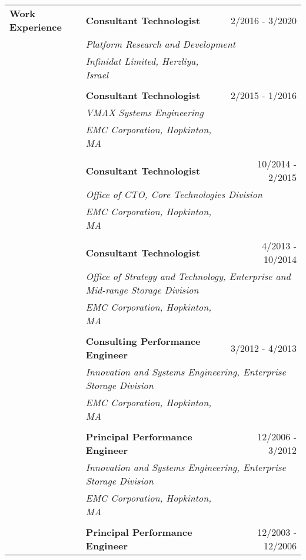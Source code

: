 \documentclass[10pt]{article}
\begin{document}
\begin{longtable}{p{ 90pt}p{299pt}r}
{\bf Work Experience} & {\bf Consultant Technologist} & {2/2016 - 3/2020}\\
                      & \multicolumn{2}{p{4.5in}}{\em Platform Research and Development} \\
                      & {\em Infinidat Limited, Herzliya, Israel} \\
\\
                      & {\bf Consultant Technologist} & {2/2015 - 1/2016}\\
                      & \multicolumn{2}{p{4.5in}}{\em VMAX Systems Engineering} \\
                      & {\em EMC Corporation, Hopkinton, MA} \\
\\
                      & {\bf Consultant Technologist} & {10/2014 - 2/2015}\\
                      & \multicolumn{2}{p{4.5in}}{\em Office of CTO, Core Technologies Division} \\
                      & {\em EMC Corporation, Hopkinton, MA} \\
\\
                      & {\bf Consultant Technologist} & {4/2013 - 10/2014}\\
                      & \multicolumn{2}{p{4.5in}}{\em Office of Strategy and Technology, Enterprise and Mid-range Storage Division} \\
                      & {\em EMC Corporation, Hopkinton, MA} \\
\\
                      & {\bf Consulting Performance Engineer} & {3/2012 - 4/2013}\\
                      & \multicolumn{2}{p{4.5in}}{\em Innovation and Systems Engineering, Enterprise Storage Division} \\
                      & {\em EMC Corporation, Hopkinton, MA} \\
\\
                      & {\bf Principal Performance Engineer} & {12/2006 - 3/2012}\\
                      & \multicolumn{2}{p{4.5in}}{\em Innovation and Systems Engineering, Enterprise Storage Division} \\
                      & {\em EMC Corporation, Hopkinton, MA} \\
\\
                      & {\bf Principal Performance Engineer} & {12/2003 - 12/2006}\\

\end{longtable}
\end{document}
